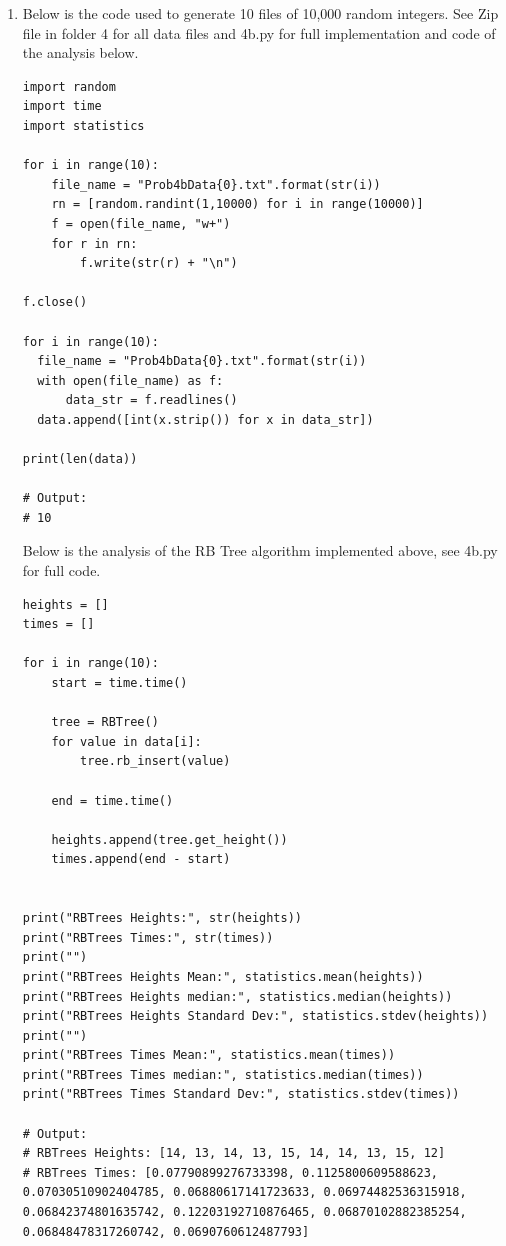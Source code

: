 \documentclass{article}
\begin{document}
\begin{enumerate}
\begin{enumerate}
      \item Below is the code used to generate 10 files of 10,000 random integers. See Zip file in folder 4 for all data files and 4b.py for full implementation and code of the analysis below.
      
      \begin{lstlisting}
import random
import time
import statistics

for i in range(10):
    file_name = "Prob4bData{0}.txt".format(str(i))
    rn = [random.randint(1,10000) for i in range(10000)]
    f = open(file_name, "w+")
    for r in rn: 
        f.write(str(r) + "\n")

f.close()

for i in range(10):
  file_name = "Prob4bData{0}.txt".format(str(i))
  with open(file_name) as f:
      data_str = f.readlines()
  data.append([int(x.strip()) for x in data_str])

print(len(data))

# Output:
# 10
      \end{lstlisting}

      Below is the analysis of the RB Tree algorithm implemented above, see 4b.py for full code. 

      \begin{lstlisting}
heights = []
times = []

for i in range(10):
    start = time.time()
    
    tree = RBTree()
    for value in data[i]:
        tree.rb_insert(value)
    
    end = time.time()
    
    heights.append(tree.get_height())
    times.append(end - start)

    
print("RBTrees Heights:", str(heights))
print("RBTrees Times:", str(times))
print("")
print("RBTrees Heights Mean:", statistics.mean(heights))
print("RBTrees Heights median:", statistics.median(heights))
print("RBTrees Heights Standard Dev:", statistics.stdev(heights))
print("")
print("RBTrees Times Mean:", statistics.mean(times))
print("RBTrees Times median:", statistics.median(times))
print("RBTrees Times Standard Dev:", statistics.stdev(times))

# Output:
# RBTrees Heights: [14, 13, 14, 13, 15, 14, 14, 13, 15, 12]
# RBTrees Times: [0.07790899276733398, 0.1125800609588623, 0.07030510902404785, 0.06880617141723633, 0.06974482536315918, 0.06842374801635742, 0.12203192710876465, 0.06870102882385254, 0.06848478317260742, 0.0690760612487793]


\end{lstlisting}
\end{enumerate}
\end{enumerate}
\end{document}

